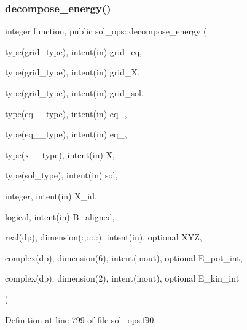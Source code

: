 \subsubsection{\texorpdfstring{decompose\+\_\+energy()}{decompose\_energy()}}
{\footnotesize\ttfamily integer function, public sol\+\_\+ops\+::decompose\+\_\+energy (\begin{DoxyParamCaption}\item[{type(grid\+\_\+type), intent(in)}]{grid\+\_\+eq,  }\item[{type(grid\+\_\+type), intent(in)}]{grid\+\_\+X,  }\item[{type(grid\+\_\+type), intent(in)}]{grid\+\_\+sol,  }\item[{type(eq\+\_\+1\+\_\+type), intent(in)}]{eq\+\_,  }\item[{type(eq\+\_\+2\+\_\+type), intent(in)}]{eq\+\_,  }\item[{type(x\+\_\+1\+\_\+type), intent(in)}]{X,  }\item[{type(sol\+\_\+type), intent(in)}]{sol,  }\item[{integer, intent(in)}]{X\+\_\+id,  }\item[{logical, intent(in)}]{B\+\_\+aligned,  }\item[{real(dp), dimension(\+:,\+:,\+:,\+:), intent(in), optional}]{X\+YZ,  }\item[{complex(dp), dimension(6), intent(inout), optional}]{E\+\_\+pot\+\_\+int,  }\item[{complex(dp), dimension(2), intent(inout), optional}]{E\+\_\+kin\+\_\+int }\end{DoxyParamCaption})}



Definition at line 799 of file sol\+\_\+ops.\+f90.

